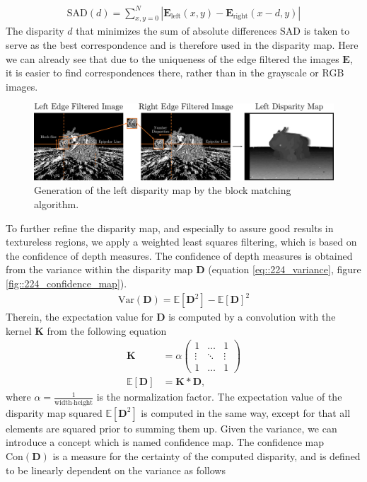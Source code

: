 \begin{align}
	\text{SAD}(d) = \sum_{x,y=0}^N |\bm{E}_\text{left}(x,y) - \bm{E}_\text{right}(x-d,y)|
	\label{eq::224_sad}
\end{align}
The disparity $d$ that minimizes the sum of absolute differences SAD is taken to serve as the best correspondence and is therefore used in the disparity map.  Here we can already see that due to the uniqueness of the edge filtered the images $\bm{E}$, it is easier to find correspondences there, rather than in the grayscale or RGB images.
\begin{figure}[h!]
	\centering
	\includegraphics[scale=.28]{chapters/03_principles_of_machine_learning/img/left_disparity_map.png}
	\caption{Generation of the left disparity map by the block matching algorithm.}
	\label{fig::224_left_disparity_map}
\end{figure}
To further refine the disparity map, and especially to assure good results in textureless  regions, we apply a weighted least squares filtering, which is based on the confidence of depth measures. The confidence of depth measures is obtained from the variance within the disparity map $\bm{D}$ (equation \ref{eq::224_variance}, figure \ref{fig::224_confidence_map}).
\begin{align}
	 \text{Var}(\bm{D}) = \mathbb{E}\left[\bm{D}^2\right] - \mathbb{E}\left[\bm{D}\right]^2
	\label{eq::224_variance}
\end{align} 
Therein, the expectation value for $\bm{D}$ is computed by a convolution with the kernel $\bm{K}$ from the following equation
\begin{align}
	\bm{K} &= \alpha
	\begin{pmatrix}
	1 & \dots & 1 \\
	\vdots & \ddots & \vdots \\
	1 & \dots & 1
	\end{pmatrix} \\
	\mathbb{E}\left[\bm{D}\right] &= \bm{K}*\bm{D},
	\label{eq::224_kernel}
\end{align}
where $\alpha = \frac{1}{\text{width}\cdot\text{height}}$ is the normalization factor. The expectation value of the disparity map squared $\mathbb{E}\left[\bm{D}^2\right]$ is computed in the same way, except for that all elements are squared prior to summing them up. Given the variance, we can introduce a concept which is named confidence map. The confidence map $\text{Con}(\bm{D})$ is a measure for the certainty of the computed disparity, and is defined to be linearly dependent on the variance as follows
